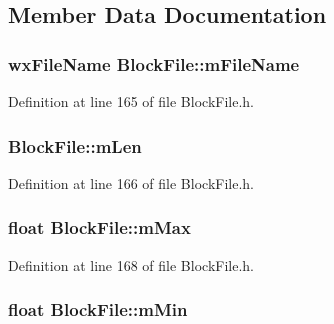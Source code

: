 \subsection{Member Data Documentation}
\subsubsection[{\texorpdfstring{m\+File\+Name}{mFileName}}]{\setlength{\rightskip}{0pt plus 5cm}wx\+File\+Name Block\+File\+::m\+File\+Name\hspace{0.3cm}{\ttfamily [protected]}}\hypertarget{class_block_file_ab4d7e450d154ad4ccee1d0f4a26093f0}{}\label{class_block_file_ab4d7e450d154ad4ccee1d0f4a26093f0}


Definition at line 165 of file Block\+File.\+h.

\subsubsection[{\texorpdfstring{m\+Len}{mLen}}]{ Block\+File\+::m\+Len\hspace{0.3cm}{\ttfamily [protected]}}\hypertarget{class_block_file_a732a85cd5906a03310bd23fc91b83d40}{}\label{class_block_file_a732a85cd5906a03310bd23fc91b83d40}


Definition at line 166 of file Block\+File.\+h.

\subsubsection[{\texorpdfstring{m\+Max}{mMax}}]{\setlength{\rightskip}{0pt plus 5cm}float Block\+File\+::m\+Max\hspace{0.3cm}{\ttfamily [protected]}}\hypertarget{class_block_file_abda14ef73ea31a585b26e289a99ac356}{}\label{class_block_file_abda14ef73ea31a585b26e289a99ac356}


Definition at line 168 of file Block\+File.\+h.

\subsubsection[{\texorpdfstring{m\+Min}{mMin}}]{\setlength{\rightskip}{0pt plus 5cm}float Block\+File\+::m\+Min\hspace{0.3cm}{\ttfamily [protected]}}\hypertarget{class_block_file_a733757c3a2c9d2e51beab8acbc86f913}{}\label{class_block_file_a733757c3a2c9d2e51beab8acbc86f913}


